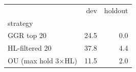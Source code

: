 \begin{tabular}{lrr}
\toprule
 & dev & holdout \\
strategy &  &  \\
\midrule
GGR top 20 & 24.5 & 0.0 \\
HL-filtered 20 & 37.8 & 4.4 \\
OU (max hold 3×HL) & 11.5 & 2.0 \\
\bottomrule
\end{tabular}
